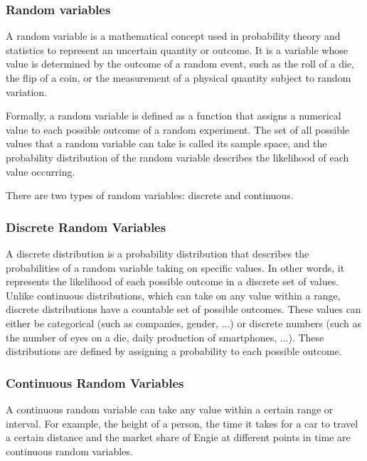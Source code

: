 \documentclass[10pt]{extarticle}
\newcommand{\<}{\langle}
\renewcommand{\>}{\rangle}
\theoremstyle{mystyle}{\newtheorem*{remark}{Remark}}
\theoremstyle{mystyle}{\newtheorem*{remarks}{Remarks}}
\theoremstyle{mystyle}{\newtheorem*{example}{Example}}
\theoremstyle{mystyle}{\newtheorem*{examples}{Examples}}
\theoremstyle{definition}{\newtheorem*{exercise}{Exercise}}
\theoremstyle{warn}
\begin{document}
\subsubsection{Random variables}
A random variable is a mathematical concept used in probability theory and statistics to represent an uncertain quantity or outcome. It is a variable whose value is determined by the outcome of a random event, such as the roll of a die, the flip of a coin, or the measurement of a physical quantity subject to random variation.

Formally, a random variable is defined as a function that assigns a numerical value to each possible outcome of a random experiment. The set of all possible values that a random variable can take is called its sample space, and the probability distribution of the random variable describes the likelihood of each value occurring.

There are two types of random variables: discrete and continuous.

\subsubsection*{Discrete Random Variables}
A discrete distribution is a probability distribution that describes the probabilities of a random variable taking on specific values. In other words, it represents the likelihood of each possible outcome in a discrete set of values. Unlike continuous distributions, which can take on any value within a range, discrete distributions have a countable set of possible outcomes. These values can either be categorical (such as companies, gender, ...) or discrete numbers (such as the number of eyes on a die, daily production of smartphones, ...). These distributions are defined by assigning a probability to each possible outcome.


\subsubsection*{Continuous Random Variables}
A continuous random variable can take any value within a certain range or interval. For example, the height of a person, the time it takes for a car to travel a certain distance and the market share of Engie at different points in time are continuous random variables.
\end{document}
